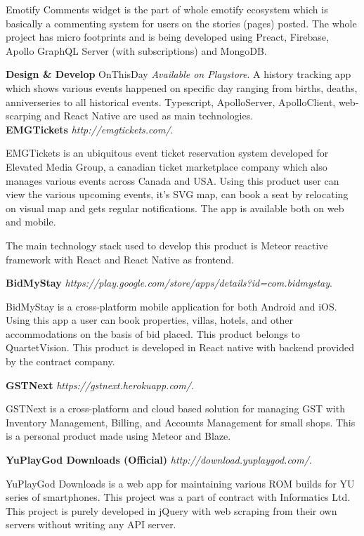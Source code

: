 \documentclass[margin,line]{res}
\begin{document}
\begin{resume}
Emotify Comments widget is the part of whole emotify ecosystem which is basically a commenting system for users on the stories (pages) posted. The whole project has micro footprints and is being developed using Preact, Firebase, Apollo GraphQL Server (with subscriptions) and MongoDB.

\textbf{Design \& Develop} OnThisDay {\em Available on Playstore}. A history tracking app which shows various events happened on specific day ranging from births, deaths, anniverseries to all historical events. Typescript, ApolloServer, ApolloClient, web-scarping and React Native are used as main technologies.\\  

 
\textbf{EMGTickets} {\em http://emgtickets.com/}. 

EMGTickets is an ubiquitous event ticket reservation system developed for Elevated Media Group, a canadian ticket marketplace company which also manages various events across Canada and USA. Using this product user can view the various upcoming events, it's SVG map, can book a seat by relocating on visual map and gets regular notifications. The app is available both on web and mobile. 

The main technology stack used to develop this product is Meteor reactive framework with React and React Native as frontend.

\textbf{BidMyStay} {\em https://play.google.com/store/apps/details?id=com.bidmystay}. 

BidMyStay is a cross-platform mobile application for both Android and iOS. Using this app a user can book properties, villas, hotels, and other accommodations on the basis of bid placed. This product belongs to QuartetVision. This product is developed in React native with backend provided by the contract company.

\textbf{GSTNext} {\em https://gstnext.herokuapp.com/}.

GSTNext is a cross-platform and cloud based solution for managing GST with Inventory Management, Billing, and Accounts Management for small shops. This is a personal product made using Meteor and Blaze.

\textbf{YuPlayGod Downloads (Official)} {\em http://download.yuplaygod.com/}. 

YuPlayGod Downloads is a web app for maintaining various ROM builds for YU series of smartphones. This project was a part of contract with Informatics Ltd. This project is purely developed in jQuery with web scraping from their own servers without writing any API server.


\end{resume}
\end{document}
